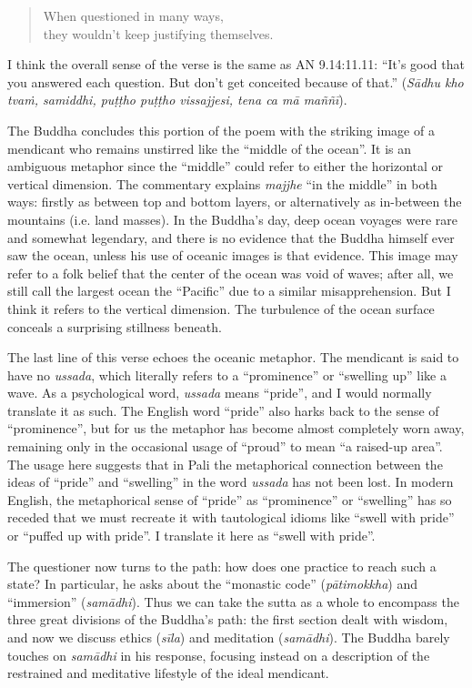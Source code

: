 \documentclass[12pt,openany]{book}%
\begin{document}
\begin{verse}%
When questioned in many ways, \\
they wouldn’t keep justifying themselves.

%
\end{verse}

I think the overall sense of the verse is the same as AN 9.14:11.11: “It’s good that you answered each question. But don’t get conceited because of that.” (\textit{\textsanskrit{Sādhu} kho \textsanskrit{tvaṁ}, samiddhi, \textsanskrit{puṭṭho} \textsanskrit{puṭṭho} vissajjesi, tena ca \textsanskrit{mā} \textsanskrit{maññī}}).

The Buddha concludes this portion of the poem with the striking image of a mendicant who remains unstirred like the “middle of the ocean”. It is an ambiguous metaphor since the “middle” could refer to either the horizontal or vertical dimension. The commentary explains \textit{majjhe} “in the middle” in both ways: firstly as between top and bottom layers, or alternatively as in-between the mountains (i.e. land masses). In the Buddha’s day, deep ocean voyages were rare and somewhat legendary, and there is no evidence that the Buddha himself ever saw the ocean, unless his use of oceanic images is that evidence. This image may refer to a folk belief that the center of the ocean was void of waves; after all, we still call the largest ocean the “Pacific” due to a similar misapprehension. But I think it refers to the vertical dimension. The turbulence of the ocean surface conceals a surprising stillness beneath.

The last line of this verse echoes the oceanic metaphor. The mendicant is said to have no \textit{ussada}, which literally refers to a “prominence” or “swelling up” like a wave. As a psychological word, \textit{ussada} means “pride”, and I would normally translate it as such. The English word “pride” also harks back to the sense of “prominence”, but for us the metaphor has become almost completely worn away, remaining only in the occasional usage of “proud” to mean “a raised-up area”. The usage here suggests that in Pali the metaphorical connection between the ideas of “pride” and “swelling” in the word \textit{ussada} has not been lost. In modern English, the metaphorical sense of “pride” as “prominence” or “swelling” has so receded that we must recreate it with tautological idioms like “swell with pride” or “puffed up with pride”. I translate it here as “swell with pride”.

The questioner now turns to the path: how does one practice to reach such a state? In particular, he asks about the “monastic code” (\textit{\textsanskrit{pātimokkha}}) and “immersion” (\textit{\textsanskrit{samādhi}}). Thus we can take the sutta as a whole to encompass the three great divisions of the Buddha’s path: the first section dealt with wisdom, and now we discuss ethics (\textit{\textsanskrit{sīla}}) and meditation (\textit{\textsanskrit{samādhi}}). The Buddha barely touches on \textit{\textsanskrit{samādhi}} in his response, focusing instead on a description of the restrained and meditative lifestyle of the ideal mendicant.
\end{document}
